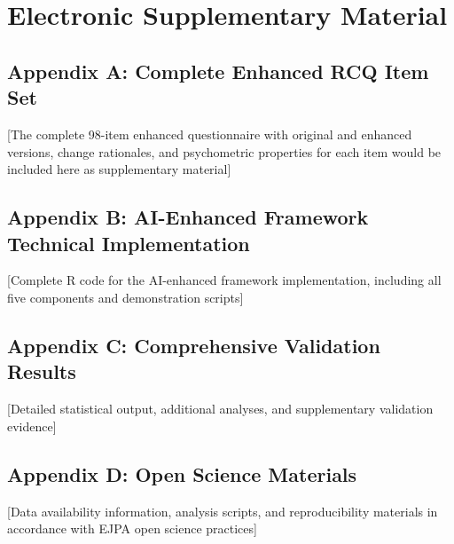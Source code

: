 \documentclass[12pt,a4paper]{article}
\begin{document}
\newpage

\section{Electronic Supplementary Material}

\subsection{Appendix A: Complete Enhanced RCQ Item Set}

[The complete 98-item enhanced questionnaire with original and enhanced versions, change rationales, and psychometric properties for each item would be included here as supplementary material]

\subsection{Appendix B: AI-Enhanced Framework Technical Implementation}

[Complete R code for the AI-enhanced framework implementation, including all five components and demonstration scripts]

\subsection{Appendix C: Comprehensive Validation Results}

[Detailed statistical output, additional analyses, and supplementary validation evidence]

\subsection{Appendix D: Open Science Materials}

[Data availability information, analysis scripts, and reproducibility materials in accordance with EJPA open science practices]
\end{document}
